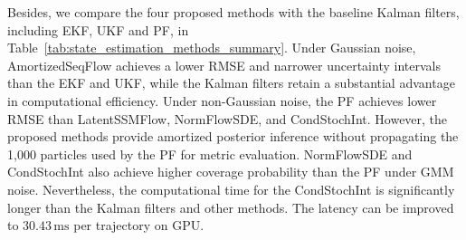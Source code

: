 Besides, we compare the four proposed methods with the baseline Kalman filters, including \ac{EKF}, \ac{UKF} and \ac{PF}, in Table~\ref{tab:state_estimation_methods_summary}. Under Gaussian noise, AmortizedSeqFlow achieves a lower RMSE and narrower uncertainty intervals than the \ac{EKF} and \ac{UKF}, while the Kalman filters retain a substantial advantage in computational efficiency. Under non-Gaussian noise, the \ac{PF} achieves lower RMSE than LatentSSMFlow, NormFlowSDE, and CondStochInt. However, the proposed methods provide amortized posterior inference without propagating the 1,000 particles used by the \ac{PF} for metric evaluation. NormFlowSDE and CondStochInt also achieve higher coverage probability than the \ac{PF} under GMM noise. Nevertheless, the computational time for the CondStochInt is significantly longer than the Kalman filters and other methods. The latency can be improved to $30.43\,\mathrm{ms}$ per trajectory on GPU.